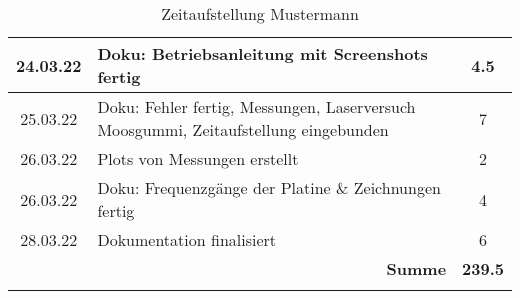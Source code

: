 \begin{longtable}{c|p{10cm}|c}
    24.03.22       & Doku: Betriebsanleitung mit Screenshots fertig                                                                & 4.5              \\ \hline
    25.03.22       & Doku: Fehler fertig, Messungen, \newline Laserversuch Moosgummi, Zeitaufstellung eingebunden                  & 7                \\ \hline
    26.03.22       & Plots von Messungen erstellt & 2 \\ \hline
    26.03.22       & Doku: Frequenzgänge der Platine \& Zeichnungen fertig & 4 \\ \hline
    28.03.22       & Dokumentation finalisiert & 6 \\ \hline
    & \multicolumn{1}{r|}{\textbf{Summe}} &   \textbf{239.5} \\

    \caption{Zeitaufstellung Mustermann}
    \label{tab:zeit_clee}
\end{longtable}
\pagebreak
